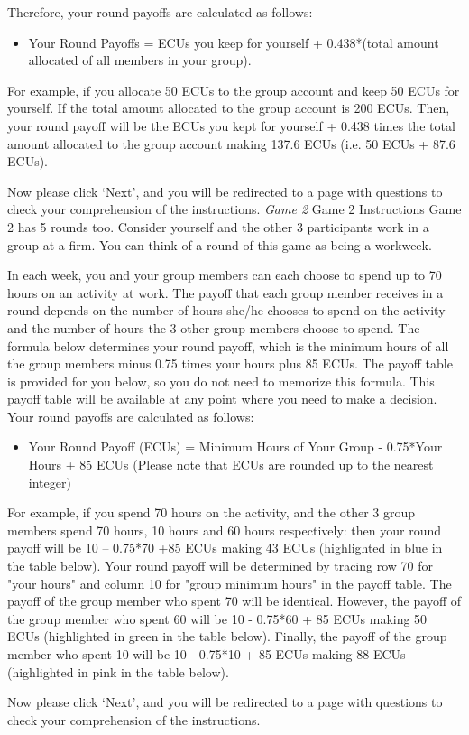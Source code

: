 Therefore, your round payoffs are calculated as follows:
\begin{itemize}
    \item Your Round Payoffs = ECUs you keep for yourself + 0.438*(total amount allocated of all members in your group).
\end{itemize}

For example, if you allocate 50 ECUs to the group account and keep 50 ECUs for yourself. If the total amount allocated to the group account is 200 ECUs. Then, your round payoff will be the ECUs you kept for yourself + 0.438 times the total amount allocated to the group account making 137.6 ECUs (i.e. 50 ECUs + 87.6 ECUs).

Now please click ‘Next’, and you will be redirected to a page with questions to check your comprehension of the instructions.
\newline
\textit{Game 2}
\newline
Game 2 Instructions
\newline
Game 2 has 5 rounds too. Consider yourself and the other 3 participants work in a group at a firm. You can think of a round of this game as being a workweek.

In each week, you and your group members can each choose to spend up to 70 hours on an activity at work. The payoff that each group member receives in a round depends on the number of hours she/he chooses to spend on the activity and the number of hours the 3 other group members choose to spend. The formula below determines your round payoff, which is the minimum hours of all the group members minus 0.75 times your hours plus 85 ECUs. The payoff table is provided for you below, so you do not need to memorize this formula. This payoff table will be available at any point where you need to make a decision. Your round payoffs are calculated as follows:
\begin{itemize}
    \item Your Round Payoff (ECUs) = Minimum Hours of Your Group - 0.75*Your Hours + 85 ECUs (Please note that ECUs are rounded up to the nearest integer)
\end{itemize}


For example, if you spend 70 hours on the activity, and the other 3 group members spend 70 hours, 10 hours and 60 hours respectively: then your round payoff will be 10 – 0.75*70 +85 ECUs making 43 ECUs (highlighted in blue in the table below). Your round payoff will be determined by tracing row 70 for "your hours" and column 10 for "group minimum hours" in the payoff table. The payoff of the group member who spent 70 will be identical. However, the payoff of the group member who spent 60 will be 10 - 0.75*60 + 85 ECUs making 50 ECUs (highlighted in green in the table below). Finally, the payoff of the group member who spent 10 will be 10 - 0.75*10 + 85 ECUs making 88 ECUs (highlighted in pink in the table below).

Now please click ‘Next’, and you will be redirected to a page with questions to check your comprehension of the instructions.

 
% 